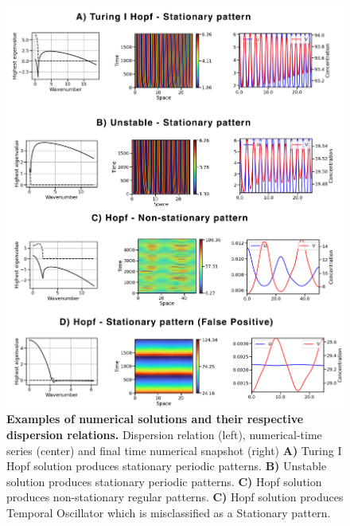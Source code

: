 \begin{figure}[H] %
    \centering
    \begin{adjustbox}{center}
        \includegraphics[width=1.2\textwidth]{chapters/Chapter 1/interesting_cases_nogrowth} %
    \end{adjustbox}
    \caption{\textbf{Examples of numerical solutions and their respective dispersion relations.} Dispersion relation (left), numerical-time series (center) and final time numerical snapshot (right) \textbf{A)} Turing I Hopf solution produces stationary periodic patterns. \textbf{B)} Unstable solution produces stationary periodic patterns. \textbf{C)} Hopf solution produces non-stationary regular patterns. \textbf{C)} Hopf solution produces Temporal Oscillator which is misclassified as a Stationary pattern.}
    \label{fig:interesting_cases_nogrowth} %
\end{figure}
